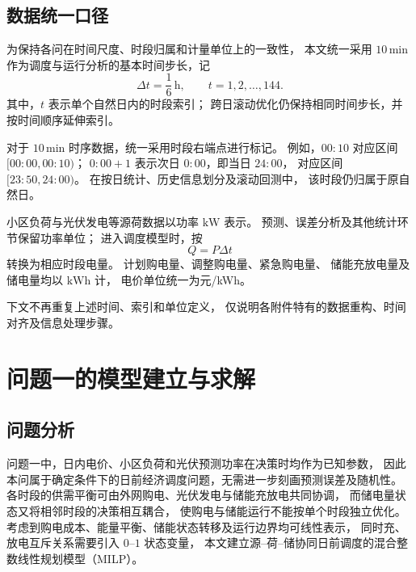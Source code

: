 \documentclass[zihao=-4,a4paper,UTF8,fontset=none]{ctexart}
\begin{document}
\subsection{数据统一口径}
为保持各问在时间尺度、时段归属和计量单位上的一致性，
本文统一采用 $10\,\mathrm{min}$ 作为调度与运行分析的基本时间步长，记
\begin{equation}
    \Delta t=\frac{1}{6}\,\mathrm h,
    \qquad
    t=1,2,\ldots,144.
\end{equation}
其中，$t$ 表示单个自然日内的时段索引；
跨日滚动优化仍保持相同时间步长，并按时间顺序延伸索引。

对于 $10\,\mathrm{min}$ 时序数据，统一采用时段右端点进行标记。
例如，$00{:}10$ 对应区间 $[00{:}00,00{:}10)$；
$0{:}00+1$ 表示次日 $0{:}00$，即当日 $24{:}00$，
对应区间 $[23{:}50,24{:}00)$。
在按日统计、历史信息划分及滚动回测中，
该时段仍归属于原自然日。

小区负荷与光伏发电等源荷数据以功率 $\mathrm{kW}$ 表示。
预测、误差分析及其他统计环节保留功率单位；
进入调度模型时，按
\begin{equation}
    Q=P\Delta t
\end{equation}
转换为相应时段电量。
计划购电量、调整购电量、紧急购电量、
储能充放电量及储电量均以 $\mathrm{kWh}$ 计，
电价单位统一为元/kWh。

下文不再重复上述时间、索引和单位定义，
仅说明各附件特有的数据重构、时间对齐及信息处理步骤。


\section{问题一的模型建立与求解}

\subsection{问题分析}

问题一中，日内电价、小区负荷和光伏预测功率在决策时均作为已知参数，
因此本问属于确定条件下的日前经济调度问题，无需进一步刻画预测误差及随机性。
各时段的供需平衡可由外网购电、光伏发电与储能充放电共同协调，
而储电量状态又将相邻时段的决策相互耦合，
使购电与储能运行不能按单个时段独立优化。
考虑到购电成本、能量平衡、储能状态转移及运行边界均可线性表示，
同时充、放电互斥关系需要引入 $0$--$1$ 状态变量，
本文建立源--荷--储协同日前调度的混合整数线性规划模型（MILP）。
\end{document}
